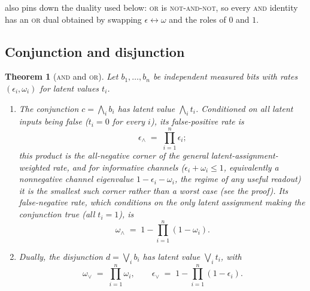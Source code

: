 \documentclass[11pt]{article}
\numberwithin{equation}{section}
\theoremstyle{plain}
\newtheorem{theorem}{Theorem}[section]
\theoremstyle{definition}
\theoremstyle{remark}
\newcommand{\eps}{\epsilon}
\begin{document}
 also pins down the duality used below: \textsc{or} is
\textsc{not}-\textsc{and}-\textsc{not}, so every \textsc{and} identity has an
\textsc{or} dual obtained by swapping $\eps\leftrightarrow\omega$ and the roles
of $0$ and $1$.

\subsection{Conjunction and disjunction}

\begin{theorem}[\textsc{and} and \textsc{or}]
\label{thm:andor}
Let $b_1,\dots,b_n$ be independent measured bits with rates
$(\eps_i,\omega_i)$ for latent values $t_i$.
\begin{enumerate}[label=(\roman*),leftmargin=2em]
  \item The conjunction $c=\bigwedge_i b_i$ has latent value $\bigwedge_i t_i$.
        Conditioned on all latent inputs being false ($t_i=0$ for every $i$), its
        false-positive rate is
        \begin{equation}
        \label{eq:and-fpr}
          \eps_{\wedge} \;=\; \prod_{i=1}^{n} \eps_i ;
        \end{equation}
        this product is the all-negative corner of the general
        latent-assignment-weighted rate, and for informative channels
        ($\eps_i+\omega_i\le1$, equivalently a nonnegative channel eigenvalue
        $1-\eps_i-\omega_i$, the regime of any useful readout) it is the
        smallest such corner rather than a worst case (see the proof). Its false-negative rate, which conditions on
        the only latent assignment making the conjunction true (all $t_i=1$), is
        \begin{equation}
        \label{eq:and-fnr}
          \omega_{\wedge} \;=\; 1 - \prod_{i=1}^{n}(1-\omega_i).
        \end{equation}
  \item Dually, the disjunction $d=\bigvee_i b_i$ has latent value
        $\bigvee_i t_i$, with
        \begin{equation}
        \label{eq:or}
          \omega_{\vee} \;=\; \prod_{i=1}^{n}\omega_i,
          \qquad
          \eps_{\vee} \;=\; 1 - \prod_{i=1}^{n}(1-\eps_i).
        \end{equation}
\end{enumerate}
\end{theorem}
\end{document}
